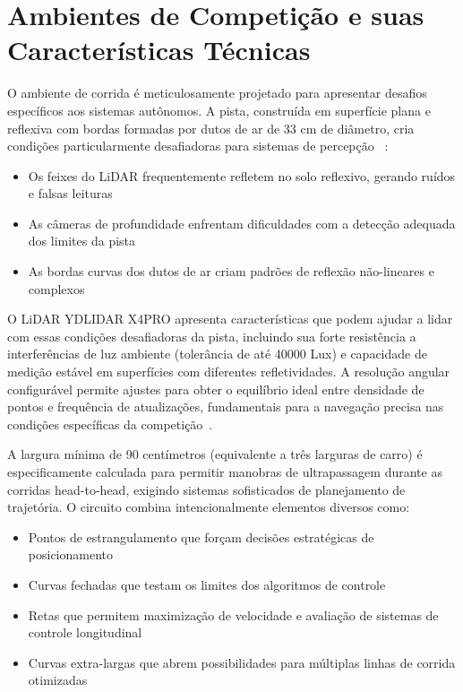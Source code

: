 \section{Ambientes de Competição e suas Características Técnicas}

O ambiente de corrida é meticulosamente projetado para apresentar desafios
específicos aos sistemas autônomos. A pista, construída em superfície plana e
reflexiva com bordas formadas por dutos de ar de 33 cm de diâmetro, cria
condições particularmente desafiadoras para sistemas de percepção
~\cite{OKelly2020F1TENTH}:

\begin{itemize}
      \item Os feixes do LiDAR frequentemente refletem no solo reflexivo, gerando ruídos e
            falsas leituras
      \item As câmeras de profundidade enfrentam dificuldades com a detecção adequada dos
            limites da pista
      \item As bordas curvas dos dutos de ar criam padrões de reflexão não-lineares e
            complexos
\end{itemize}

O LiDAR YDLIDAR X4PRO apresenta características que podem ajudar a lidar com
essas condições desafiadoras da pista, incluindo sua forte resistência a
interferências de luz ambiente (tolerância de até 40000 Lux) e capacidade de
medição estável em superfícies com diferentes refletividades. A resolução
angular configurável permite ajustes para obter o equilíbrio ideal entre
densidade de pontos e frequência de atualizações, fundamentais para a navegação
precisa nas condições específicas da competição~\cite{OKelly2020F1TENTH}.

A largura mínima de 90 centímetros (equivalente a três larguras de carro) é
especificamente calculada para permitir manobras de ultrapassagem durante as
corridas head-to-head, exigindo sistemas sofisticados de planejamento de
trajetória. O circuito combina intencionalmente elementos diversos como:

\begin{itemize}
      \item Pontos de estrangulamento que forçam decisões estratégicas de posicionamento
      \item Curvas fechadas que testam os limites dos algoritmos de controle
      \item Retas que permitem maximização de velocidade e avaliação de sistemas de
            controle longitudinal
      \item Curvas extra-largas que abrem possibilidades para múltiplas linhas de corrida
            otimizadas
\end{itemize}

